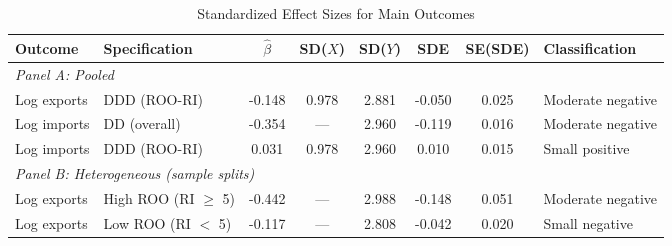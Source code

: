 \begin{table}[H]
\centering
\caption{Standardized Effect Sizes for Main Outcomes}
\label{tab:sde}
\begin{threeparttable}
\footnotesize
\begin{adjustbox}{max width=\textwidth}
\begin{tabular}{llcccccl}
\toprule
Outcome & Specification & $\hat{\beta}$ & SD($X$) & SD($Y$) & SDE & SE(SDE) & Classification \\
\midrule
\multicolumn{8}{l}{\textit{Panel A: Pooled}} \\[3pt]
Log exports & DDD (ROO-RI) & -0.148 & 0.978 & 2.881 & -0.050 & 0.025 & Moderate negative \\
Log imports & DD (overall) & -0.354 & --- & 2.960 & -0.119 & 0.016 & Moderate negative \\
Log imports & DDD (ROO-RI) & 0.031 & 0.978 & 2.960 & 0.010 & 0.015 & Small positive \\
\midrule
\multicolumn{8}{l}{\textit{Panel B: Heterogeneous (sample splits)}} \\[3pt]
Log exports & High ROO (RI $\geq$ 5) & -0.442 & --- & 2.988 & -0.148 & 0.051 & Moderate negative \\
Log exports & Low ROO (RI $<$ 5) & -0.117 & --- & 2.808 & -0.042 & 0.020 & Small negative \\
\bottomrule
\end{tabular}
\end{adjustbox}
\begin{tablenotes}[flushleft]
\small

\end{tablenotes}
\end{threeparttable}
\end{table}
